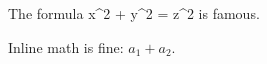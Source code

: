 \documentclass{article}
\begin{document}
The formula x^2 + y^2 = z^2 is famous.

Inline math is fine: $a_1 + a_2$.
\end{document}
